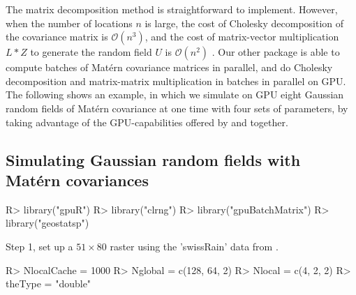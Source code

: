 \documentclass[article,nojss]{jss}\usepackage[]{graphicx}\usepackage[]{color}
\begin{document}
The matrix decomposition method is straightforward to implement. However, when the number of locations $n$ is large, the cost of Cholesky decomposition of the covariance matrix is $\mathcal{O}(n^3)$,  and the cost of matrix-vector multiplication $L*Z$ to generate the random field $U$ is $\mathcal{O}(n^2)$ \citep{LiuandLi2019}.  Our other  package  is able to compute batches of Mat\'ern covariance matrices in parallel, and do Cholesky decomposition and matrix-matrix multiplication in batches in parallel on GPU. The following shows an example, in which we simulate on GPU eight Gaussian random fields of Mat\'ern covariance at one time with four sets of parameters, by taking advantage of the GPU-capabilities offered by  and  together.

\subsection{Simulating Gaussian random fields with Mat\'ern covariances}
\begin{CodeChunk}
\begin{CodeInput}
R> library("gpuR")
R> library("clrng")
R> library("gpuBatchMatrix")
R> library("geostatsp")
\end{CodeInput} 
\end{CodeChunk} 

Step 1, set up a $51 \times 80$ raster using the 'swissRain' data from .
\begin{CodeChunk}
\begin{CodeInput}
R> NlocalCache = 1000
R> Nglobal = c(128, 64, 2)
R> Nlocal = c(4, 2, 2)
R> theType = "double"
\end{CodeInput} 
\end{CodeChunk} 
\end{document}
